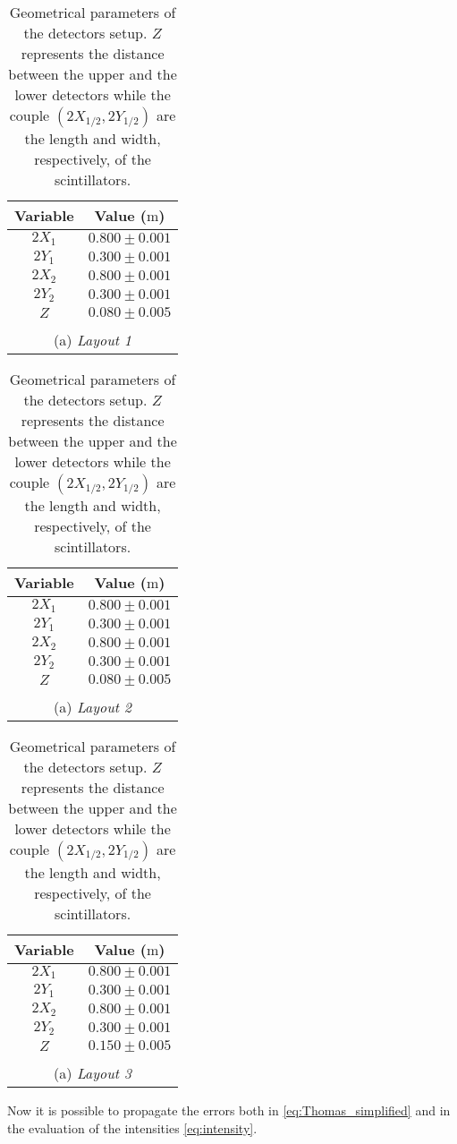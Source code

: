 \begin{table}[!htp]
	\centering
	\begin{tabular}{cc}
		\toprule
		Variable & Value ($\si{\meter}$)\\
		\midrule
		$2X_1$ & $0.800 \pm 0.001$\\
		$2Y_1$ & $0.300 \pm 0.001$\\
		$2X_2$ & $0.800 \pm 0.001$\\
		$2Y_2$ & $0.300 \pm 0.001$\\
		$Z$ & $0.080 \pm 0.005$\\
		\bottomrule
		&\\
		\multicolumn{2}{c}{\footnotesize (a) \emph{Layout 1}}
	\end{tabular}\hfill
	\begin{tabular}{cc}
		\toprule
		Variable & Value ($\si{\meter}$)\\
		\midrule
		$2X_1$ & $0.800 \pm 0.001$\\
		$2Y_1$ & $0.300 \pm 0.001$\\
		$2X_2$ & $0.800 \pm 0.001$\\
		$2Y_2$ & $0.300 \pm 0.001$\\
		$Z$ & $0.080 \pm 0.005$\\
		\bottomrule
		&\\
		\multicolumn{2}{c}{\footnotesize (a) \emph{Layout 2}}
	\end{tabular}\hfill
	\begin{tabular}{cc}
		\toprule
		Variable & Value ($\si{\meter}$)\\
		\midrule
		$2X_1$ & $0.800 \pm 0.001$\\
		$2Y_1$ & $0.300 \pm 0.001$\\
		$2X_2$ & $0.800 \pm 0.001$\\
		$2Y_2$ & $0.300 \pm 0.001$\\
		$Z$ & $0.150 \pm 0.005$\\
		\bottomrule
		&\\
		\multicolumn{2}{c}{\footnotesize (a) \emph{Layout 3}}
	\end{tabular}
	\caption{Geometrical parameters of the detectors setup. $Z$ represents the distance between the upper and the lower detectors while the couple $\left(2X_{1/2}, 2Y_{1/2}\right)$ are the length and width, respectively, of the scintillators.}
	\label{tab:set-up}
\end{table}
Now it is possible to propagate the errors both in \eqref{eq:Thomas_simplified} and in the evaluation of the intensities \eqref{eq:intensity}.\\

